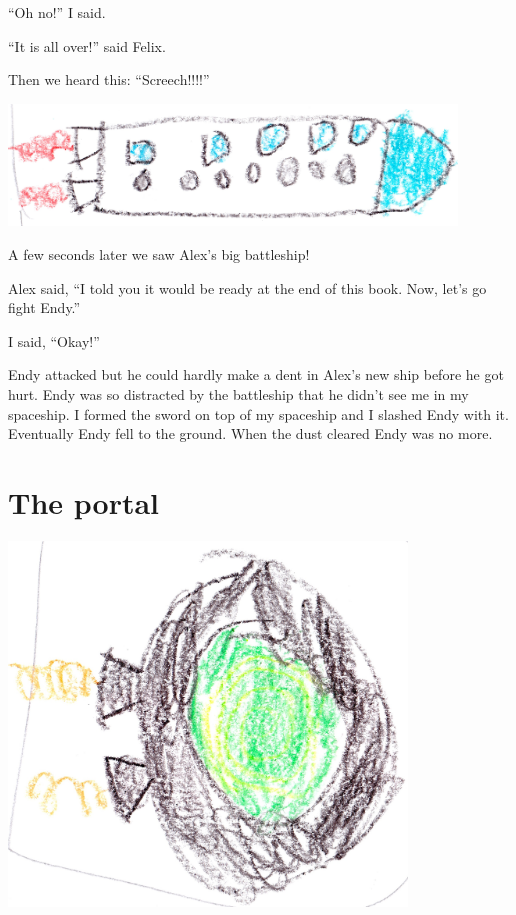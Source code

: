 \documentclass[12pt,twoside]{krantz}
\begin{document}
``Oh no!'' I said.

``It is all over!'' said Felix.

Then we heard this: ``Screech!!!!''

\includegraphics[width=4.6875in,height=\textheight]{img/four-bad-guys/longrocket.jpg}

A few seconds later we saw Alex's big battleship!

Alex said, ``I told you it would be ready at the end of this book. Now,
let's go fight Endy.''

I said, ``Okay!''

Endy attacked but he could hardly make a dent in Alex's new ship before
he got hurt. Endy was so distracted by the battleship that he didn't see
me in my spaceship. I formed the sword on top of my spaceship and I
slashed Endy with it. Eventually Endy fell to the ground. When the dust
cleared Endy was no more.

\hypertarget{the-portal}{%
\section{The portal}\label{the-portal}}

\includegraphics[width=4.16667in,height=\textheight]{img/four-bad-guys/portal.jpg}
\end{document}
